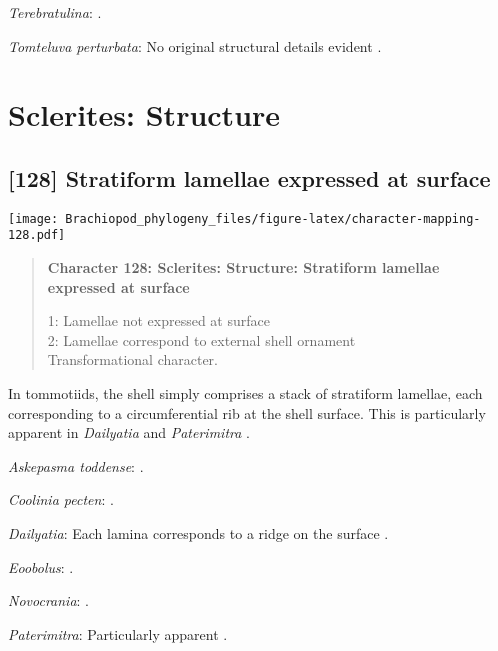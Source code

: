 \documentclass[openany]{book}
\theoremstyle{definition}
\theoremstyle{definition}
\theoremstyle{definition}
\theoremstyle{remark}
\begin{document}
\hypertarget{Terebratulina-coding-127}{}
\emph{Terebratulina}: \citet{Parkinson2005}.

\hypertarget{Tomteluva_perturbata-coding-127}{}
\emph{Tomteluva perturbata}: No original structural details evident
\citep{Streng2016Anew}.

\section{Sclerites: Structure}\label{sclerites-structure}

\subsection*{{[}128{]} Stratiform lamellae expressed at
surface}\label{stratiform-lamellae-expressed-at-surface}

\texttt{[image: Brachiopod\_phylogeny\_files/figure-latex/character-mapping-128.pdf]}

\begin{quote}
\textbf{Character 128: Sclerites: Structure: Stratiform lamellae
expressed at surface}

1: Lamellae not expressed at surface\\
2: Lamellae correspond to external shell ornament\\
Transformational character.
\end{quote}

In tommotiids, the shell simply comprises a stack of stratiform
lamellae, each corresponding to a circumferential rib at the shell
surface. This is particularly apparent in \emph{Dailyatia}
\citep{Skovsted2015Theearly} and \emph{Paterimitra}
\citep{Larsson2014iPaterimitra}.

\hypertarget{Askepasma_toddense-coding-128}{}
\emph{Askepasma toddense}: \citet{Topper2013Theoldest}.

\hypertarget{Coolinia_pecten-coding-128}{}
\emph{Coolinia pecten}: \citet{Dewing2004}.

\hypertarget{Dailyatia-coding-128}{}
\emph{Dailyatia}: Each lamina corresponds to a ridge on the surface
\citep{Skovsted2015Theearly}.

\hypertarget{Eoobolus-coding-128}{}
\emph{Eoobolus}: \citet{Balthasar2007Anearly}.

\hypertarget{Novocrania-coding-128}{}
\emph{Novocrania}: \citet{Parkinson2005}.

\hypertarget{Paterimitra-coding-128}{}
\emph{Paterimitra}: Particularly apparent
\citep{Larsson2014iPaterimitra}.
\end{document}
